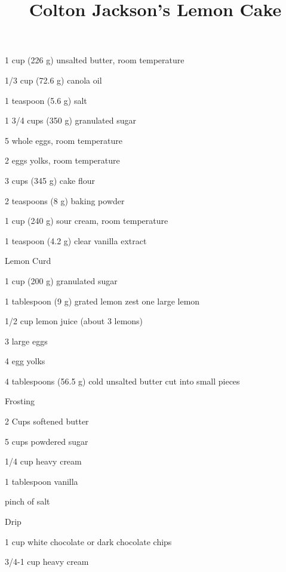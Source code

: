 \title{Colton Jackson's Lemon Cake}

\begin{ingredient}
  \begin{main}
    \item 1 cup (226 g) unsalted butter, room temperature
    \item 1/3 cup (72.6 g) canola oil
    \item 1 teaspoon (5.6 g) salt
    \item 1 3/4 cups (350 g) granulated sugar
    \item 5 whole eggs, room temperature
    \item 2 eggs yolks, room temperature
    \item 3 cups (345 g) cake flour
    \item 2 teaspoons (8 g) baking powder
    \item 1 cup (240 g)  sour cream, room temperature
    \item 1 teaspoon (4.2 g)  clear vanilla extract 
  \end{main}
  \begin{subingredient}{Lemon Curd}
    \item 1 cup (200 g) granulated sugar
    \item 1 tablespoon (9 g) grated lemon zest one large lemon
    \item 1/2 cup lemon juice (about 3 lemons)
    \item 3 large eggs
    \item 4 egg yolks
    \item 4 tablespoons (56.5 g) cold unsalted butter cut into small pieces
  \end{subingredient}
  \begin{subingredient}{Frosting}
    \item 2 Cups softened butter
    \item 5 cups powdered sugar
    \item 1/4 cup heavy cream
    \item 1 tablespoon vanilla
    \item pinch of salt
  \end{subingredient}
  \begin{subingredient}{Drip}
    \item 1 cup white chocolate or dark chocolate chips
    \item 3/4-1 cup heavy cream
  \end{subingredient}
\end{ingredient}
